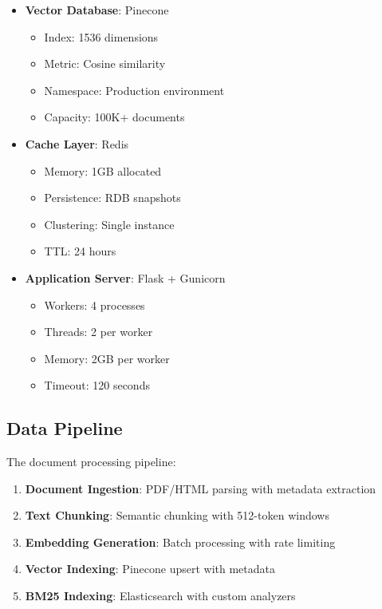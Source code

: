 \documentclass[11pt,a4paper]{article}
\begin{document}
\begin{itemize}
    \item \textbf{Vector Database}: Pinecone
    \begin{itemize}
        \item Index: 1536 dimensions
        \item Metric: Cosine similarity
        \item Namespace: Production environment
        \item Capacity: 100K+ documents
    \end{itemize}
    
    \item \textbf{Cache Layer}: Redis
    \begin{itemize}
        \item Memory: 1GB allocated
        \item Persistence: RDB snapshots
        \item Clustering: Single instance
        \item TTL: 24 hours
    \end{itemize}
    
    \item \textbf{Application Server}: Flask + Gunicorn
    \begin{itemize}
        \item Workers: 4 processes
        \item Threads: 2 per worker
        \item Memory: 2GB per worker
        \item Timeout: 120 seconds
    \end{itemize}
\end{itemize}

\subsection{Data Pipeline}

The document processing pipeline:

\begin{enumerate}
    \item \textbf{Document Ingestion}: PDF/HTML parsing with metadata extraction
    \item \textbf{Text Chunking}: Semantic chunking with 512-token windows
    \item \textbf{Embedding Generation}: Batch processing with rate limiting
    \item \textbf{Vector Indexing}: Pinecone upsert with metadata
    \item \textbf{BM25 Indexing}: Elasticsearch with custom analyzers
\end{enumerate}
\end{document}
